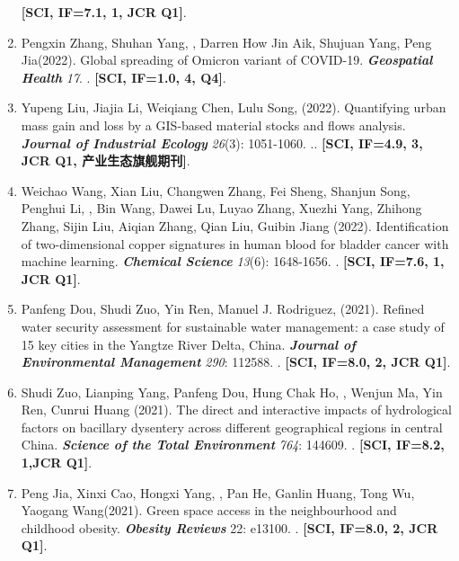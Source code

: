 \begin{enumerate}
    \textbf{[SCI, IF=7.1, 1, JCR Q1]}.
\item
    Pengxin Zhang\CF, Shuhan Yang\CF, \Shaoqing, Darren How Jin Aik, Shujuan Yang, Peng Jia\CS (2022).
    Global spreading of Omicron variant of COVID-19.
    \textbf{\textit{Geospatial Health}} \textit{17}.
    . 
    \textbf{[SCI, IF=1.0, 4, Q4]}.
\item
    Yupeng Liu\CF, Jiajia Li\CF, Weiqiang Chen\CS, Lulu Song, \Shaoqing \enspace (2022).
    Quantifying urban mass gain and loss by a GIS‐based material stocks and flows analysis.
    \textbf{\textit{Journal of Industrial Ecology}} \textit{26}(3): 1051-1060.
    .. 
    \textbf{[SCI, IF=4.9, 3, JCR Q1, 产业生态旗舰期刊]}.
\item
    Weichao Wang\CF, Xian Liu\CF, Changwen Zhang, Fei Sheng, Shanjun Song, Penghui Li, \Shaoqing, Bin Wang, Dawei Lu, Luyao Zhang, Xuezhi Yang, Zhihong Zhang, Sijin Liu, Aiqian Zhang, Qian Liu\CS, Guibin Jiang (2022).
    Identification of two-dimensional copper signatures in human blood for bladder cancer with machine learning.
    \textbf{\textit{Chemical Science}} \textit{13}(6): 1648-1656.
    .  
    \textbf{[SCI, IF=7.6, 1, JCR Q1]}.
\item
    Panfeng Dou, Shudi Zuo\CS, Yin Ren\CS, Manuel J. Rodriguez, \Shaoqing \enspace (2021).
    Refined water security assessment for sustainable water management: a case study of 15 key cities in the Yangtze River Delta, China.
    \textbf{\textit{Journal of Environmental Management}} \textit{290}: 112588.
    . 
    \textbf{[SCI, IF=8.0, 2, JCR Q1]}.
\item
    Shudi Zuo, Lianping Yang\CS, Panfeng Dou, Hung Chak Ho, \Shaoqing, Wenjun Ma, Yin Ren, Cunrui Huang (2021).
    The direct and interactive impacts of hydrological factors on bacillary dysentery across different geographical regions in central China.
    \textbf{\textit{Science of the Total Environment}} \textit{764}: 144609.
    . 
    \textbf{[SCI, IF=8.2, 1,JCR Q1]}.
\item
    Peng Jia\CF, Xinxi Cao\CF, Hongxi Yang, \Shaoqing, Pan He, Ganlin Huang, Tong Wu, Yaogang Wang\CS (2021).
    Green space access in the neighbourhood and childhood obesity.
    \textbf{\textit{Obesity Reviews}} 22: e13100.
    .
    \textbf{[SCI, IF=8.0, 2, JCR Q1]}.

\end{enumerate}
